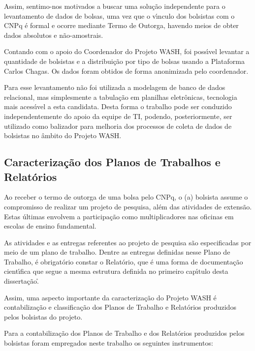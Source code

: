 \documentclass[
12pt,		%
openright,	%
twoside,  %
a4paper,			%
chapter=TITLE,		%
english,			%
french,				%
spanish,			%
brazil				%
]{USPSC-classe/USPSC}
\begin{document}
Assim, sentimo-nos motivados a buscar uma solu\c{c}\~ao independente para o levantamento de dados de bolsas, uma vez que o v\'{\i}nculo dos bolsistas com o CNPq \'e formal e ocorre mediante Termo de Outorga, havendo meios de obter dados absolutos e n\~ao-amostrais.


Contando com o apoio do Coordenador do Projeto WASH, foi poss\'{\i}vel levantar a quantidade de bolsistas e a distribui\c{c}\~ao por tipo de bolsas usando a Plataforma Carlos Chagas. Os dados foram obtidos de forma anonimizada pelo coordenador.


Para esse levantamento n\~ao foi utilizada a modelagem de banco de dados relacional, mas simplesmente a tabula\c{c}\~ao em planilhas eletr\^onicas, tecnologia mais acess\'{\i}vel a esta candidata. Desta forma o trabalho pode ser conduzido independentemente do apoio da equipe de TI, podendo, posteriormente, ser utilizado como balizador para melhoria dos processos de coleta de dados de bolsistas no \^ambito do Projeto WASH.


\subsection[Caracteriza\c{c}\~ao dos Planos de Trabalhos e Relat\'orios]{Caracteriza\c{c}\~ao dos Planos de Trabalhos e Relat\'orios}\label{Caracteriza\c{c}\~ao dos Planos de Trabalhos e Relat\'orios}
Ao receber o termo de outorga de uma bolsa pelo CNPq, o (a) bolsista assume o compromisso de realizar um projeto de pesquisa, al\'em das atividades de extens\~ao. Estas \'ultimas envolvem a participa\c{c}\~ao como multiplicadores nas oficinas em escolas de ensino fundamental.


As atividades e as entregas referentes ao projeto de pesquisa s\~ao especificadas por meio de um plano de trabalho. Dentre as entregas definidas nesse Plano de Trabalho, \'e obrigat\'orio constar o Relat\'orio, que \'e uma forma de documenta\c{c}\~ao cient\'{\i}fica que segue a mesma estrutura definida no primeiro cap\'{\i}tulo desta disserta\c{c}\~ao.\r\n


Assim, uma aspecto importante da caracteriza\c{c}\~ao do Projeto WASH \'e contabiliza\c{c}\~ao e classifica\c{c}\~ao dos Planos de Trabalho e Relat\'orios produzidos pelos bolsistas do projeto.


Para a contabiliza\c{c}\~ao dos Planos de Trabalho e dos Relat\'orios produzidos pelos bolsistas foram empregados neste trabalho os seguintes instrumentos:
\end{document}
